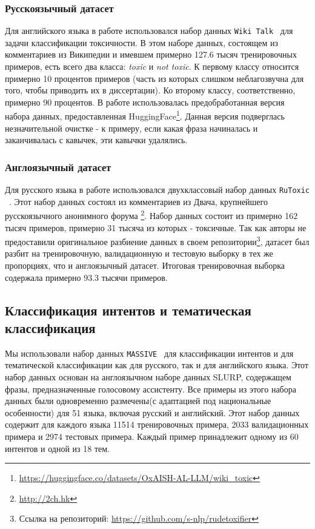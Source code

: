\subsubsection{Русскоязычный датасет} 
Для английского языка в работе использовался набор данных  \texttt{Wiki Talk}~\cite{toxic} для задачи классификации токсичности. В этом наборе данных, состоящем из комментариев из Википедии и имевшем примерно 127.6 тысяч тренировочных примеров, есть всего два класса: \textit{toxic} и \textit{not toxic}. К первому классу относится примерно 10 процентов примеров (часть из которых слишком неблагозвучна для того, чтобы приводить их в диссертации). Ко второму классу, соответственно, примерно 90 процентов.  В работе использовалась предобработанная версия набора данных, предоставленная HuggingFace\footnote{\url{https://huggingface.co/datasets/OxAISH-AL-LLM/wiki_toxic}}. Данная версия подверглась незначительной очистке - к примеру, если какая фраза начиналась и заканчивалась с кавычек, эти кавычки удалялись.  
\subsubsection{Англоязычный датасет}
Для русского языка в работе использовался двухклассовый набор данных \texttt{RuToxic} ~\cite{ru_toxic}. Этот набор данных состоял из комментариев из Двача, крупнейшего русскоязычного анонимного форума \footnote{\url{http://2ch.hk}}. Набор данных состоит из примерно 162 тысяч примеров, примерно 31 тысяча из которых - токсичные. Так как авторы не предоставили оригинальное разбиение данных в своем репозитории\footnote{Ссылка на репозиторий: \url{https://github.com/s-nlp/rudetoxifier}}, датасет был разбит на тренировочную, валидационную и тестовую выборку в тех же пропорциях, что и англоязычный датасет. Итоговая тренировочная выборка содержала примерно 93.3 тысячи примеров. 

\subsection{Классификация интентов и тематическая классификация }
Мы использовали набор данных \texttt{MASSIVE}~\cite{massive} для классификации интентов и для тематической классификации как для русского, так и для английского языка. Этот набор данных основан на англоязычном наборе данных SLURP\cite{slurp}, содержащем фразы, предназначенные голосовому ассистенту. 
 Все примеры из этого набора данных были одновременно размечены(с адаптацией под национальные особенности) для 51 языка, включая русский и английский. Этот набор данных содержит для каждого языка 11514 тренировочных примера, 2033 валидационных примера и 2974 тестовых примера. Каждый пример принадлежит одному из 60 интентов и одной из 18 тем. 


